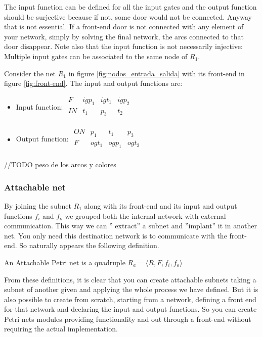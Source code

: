 {The input function can be defined for all the input gates and the output function should be surjective because if not, some door would not be connected. Anyway that is not essential. If a front-end door is not connected with any element of your network, simply by solving the final network, the arcs connected to that door disappear. Note also that the input function is not necessarily injective: Multiple input gates can be associated to the same node of $ R_1 $.

\begin{example}
Consider the net $ R_1 $ in figure \ref{fig:nodos_entrada_salida} with its front-end in figure \ref{fig:front-end}. The input and output functions are:

\begin{itemize}
\item Input function: 
$
\begin{array}{c|ccc}
F & igp_1 & igt_1 & igp_2\\
\hline
IN & t_1 & p_3 & t_2\\
\end{array}
$
\item Output function: 
$
\begin{array}{c|ccc}
ON & p_1 & t_1 & p_3\\
\hline
F & ogt_1 & ogp_1 & ogt_2\\
\end{array}
$
\end{itemize}
\end{example}

//TODO peso de los arcos y colores

\subsubsection{Attachable net}

By joining the subnet $ R_1 $ along with its front-end and its input and output functions $ f_i $ and $ f_o $ we grouped both the internal network with external communication. This way we can '' extract'' a subnet and ''implant'' it in another net. You only need this destination network is to communicate with the front-end. So naturally appears the following definition.

\begin{definition}
An Attachable Petri net is a quadruple $R_a=\langle R,F,f_i,f_o\rangle$
\end{definition}

From these definitions, it is clear that you can create attachable subnets taking a subnet of another given and applying the whole process we have defined. But it is also possible to create from scratch, starting from a network, defining a front end for that network and declaring the input and output functions. So you can create Petri nets modules providing functionality and out through a front-end without requiring the actual implementation.

}
